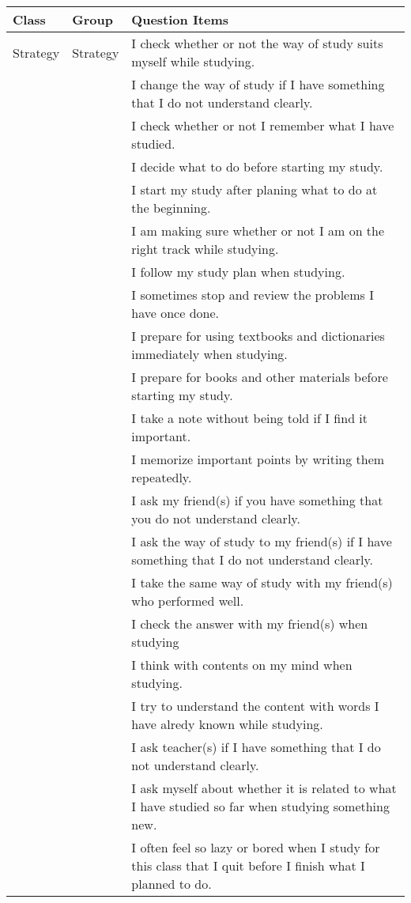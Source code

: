 \begin{tabular}{lll}
\hline \hline
Class & Group & Question Items\\
\hline
Strategy & Strategy & I check whether or not the way of study suits myself while studying.\\
 &  & I change the way of study if I have something that I do not understand clearly.\\
 &  & I check whether or not I remember what I have studied.\\
 &  & I decide what to do before starting my study.\\
 &  & I start my study after planing what to do at the beginning.\\
 &  & I am making sure whether or not I am on the right track while studying.\\
 &  & I follow my study plan when studying. \\
 &  & I sometimes stop and review the problems I have once done. \\
 &  & I prepare for using textbooks and dictionaries immediately when studying.\\
 &  & I prepare for books and other materials before starting my study.\\
 &  & I take a note without being told if I find it important.\\
 &  & I memorize important points by writing them repeatedly. \\
 &  & I ask my friend(s) if you have something that you do not understand clearly.\\
 &  & I ask the way of study to my friend(s) if I have something that I do not understand clearly.\\
 &  & I take the same way of study with my friend(s) who performed well.\\
 &  & I check the answer with my friend(s) when studying\\
 &  & I think with contents on my mind when studying.\\
 &  & I try to understand the content with words I have alredy known while studying.\\
 &  & I ask teacher(s) if I have something that I do not understand clearly.\\
 &  & I ask myself about whether it is related to what I have studied so far when studying something new.\\
 &  & I often feel so lazy or bored when I study for this class that I quit before I finish what I planned to do.\\

\end{tabular}
